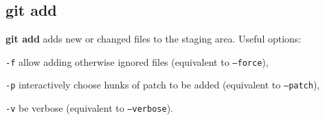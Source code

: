 %

\subsection{git add}
\textbf{git add} adds new or changed files to the staging area.
Useful options:
\begin{compactenum}
\item [\texttt{-f}] allow adding otherwise ignored files (equivalent to \texttt{--force}),
\item [\texttt{-p}] interactively choose hunks of patch to be added (equivalent to \texttt{--patch}),
\item [\texttt{-v}] be verbose (equivalent to \texttt{--verbose}).
\end{compactenum}

%